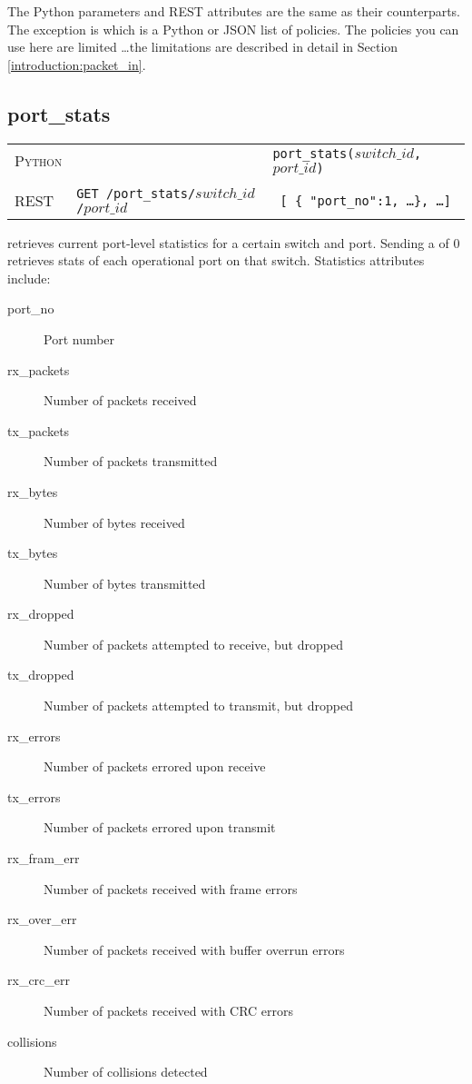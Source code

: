The Python parameters and REST attributes are the same as their  counterparts.
The exception is  which is a Python or JSON list of policies.  The policies you can
use here are limited \ldots the limitations are described in detail in Section \ref{introduction:packet_in}.  

\subsection{port\_stats}

\bigskip
\begin{tabularx}{\linewidth}{llX}
\textsc{Python} &  & \texttt{port\_stats($switch\_id$, $port\_id$)} \\ \\
\textsc{REST} & \texttt{GET /port\_stats/$switch\_id$/$port\_id$} & 
  \texttt{ [ \{ "port\_no":1, \ldots \}, \ldots ] } 
\end{tabularx}

 retrieves current port-level statistics for a certain switch and port.  Sending a 
 of 0 retrieves stats of each operational port on that switch.   Statistics attributes
include:

\begin{description}
\item[port\_no] Port number  
\item[rx\_packets] Number of packets received  
\item[tx\_packets] Number of packets transmitted  
\item[rx\_bytes] Number of bytes received  
\item[tx\_bytes] Number of bytes transmitted  
\item[rx\_dropped] Number of packets attempted to receive, but dropped  
\item[tx\_dropped] Number of packets attempted to transmit, but dropped
\item[rx\_errors] Number of packets errored upon receive 
\item[tx\_errors] Number of packets errored upon transmit
\item[rx\_fram\_err] Number of packets received with frame errors
\item[rx\_over\_err] Number of packets received with buffer overrun errors
\item[rx\_crc\_err] Number of packets received with CRC errors
\item[collisions] Number of collisions detected
\end{description}

